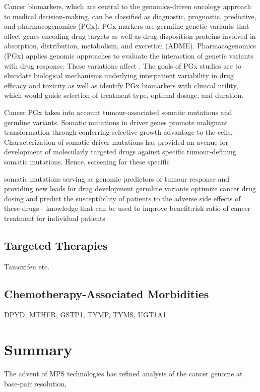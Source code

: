 Cancer biomarkers, which are central to the genomics-driven oncology approach to medical decision-making, can be classified as diagnostic, prognostic, predictive, and pharmacogenomics (PGx). PGx markers are germline genetic variants that affect genes encoding drug targets as well as drug disposition proteins involved in absorption, distribution, metabolism, and excretion (ADME).
Pharmacogenomics (PGx) applies genomic approaches to evaluate the interaction of genetic variants with drug response. These variations affect . The goals of PGx studies are to elucidate biological mechanisms underlying interpatient variability in drug efficacy and toxicity as well as identify PGx biomarkers with clinical utility, which would guide selection of treatment type, optimal dosage, and duration.

Cancer PGx takes into account tumour-associated somatic mutations and germline variants. Somatic mutations in driver genes promote malignant transformation through conferring selective growth advantage to the cells. Characterization of somatic driver mutations has provided an avenue for development of molecularly targeted drugs against specific tumour-defining somatic mutations. Hence, screening for these specific

somatic mutations serving as genomic predictors of tumour response and providing new leads for drug development
germline variants optimize cancer drug dosing and predict the susceptibility of patients to the adverse side effects of these drugs - knowledge that can be used to improve benefit:risk ratio of cancer treatment for individual patients

\subsection{Targeted Therapies}
Tamoxifen etc.

\subsection{Chemotherapy-Associated Morbidities}
DPYD, MTHFR, GSTP1, TYMP, TYMS, UGT1A1

\section{Summary}
\label{sec:Summary}

The advent of MPS technologies has refined analysis of the cancer genome at base-pair resolution,


